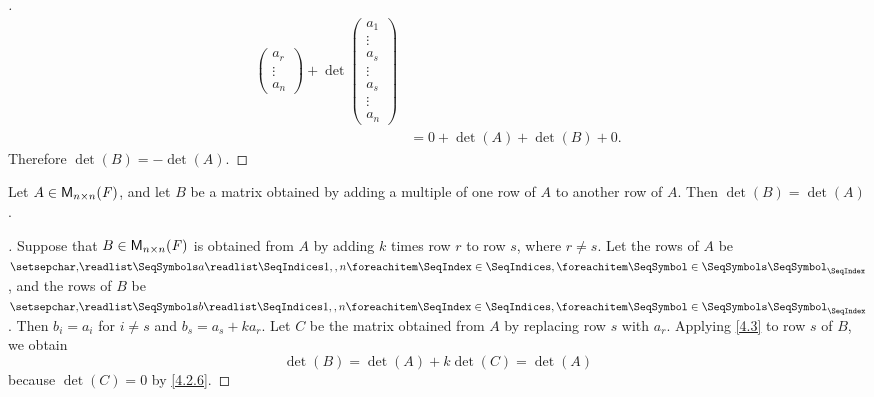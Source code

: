 \begin{proof}[]
\begin{align*}
\begin{pmatrix}
                                                        a_r    \\
                                                        \vdots \\
                                                        a_n
                                                      \end{pmatrix} + \det\begin{pmatrix}
                                                                            a_1    \\
                                                                            \vdots \\
                                                                            a_s    \\
                                                                            \vdots \\
                                                                            a_s    \\
                                                                            \vdots \\
                                                                            a_n
                                                                          \end{pmatrix} \\
      & = 0 + \det(A) + \det(B) + 0.
  \end{align*}
  Therefore \(\det(B) = -\det(A)\).
\end{proof}

\begin{thm}\label{4.6}
  Let \(A \in \mathsf{M}_{{n} \times n}({\mathit{F}})\), and let \(B\) be a matrix obtained by adding a multiple of one row of \(A\) to another row of \(A\).
  Then \(\det(B) = \det(A)\).
\end{thm}

\begin{proof}[]
  Suppose that \(B \in \mathsf{M}_{{n} \times n}({\mathit{F}})\) is obtained from \(A\) by adding \(k\) times row \(r\) to row \(s\), where \(r \neq s\).
  Let the rows of \(A\) be \(\seq{a}{1,,n}\), and the rows of \(B\) be \(\seq{b}{1,,n}\).
  Then \(b_i = a_i\) for \(i \neq s\) and \(b_s = a_s + k a_r\).
  Let \(C\) be the matrix obtained from \(A\) by replacing row \(s\) with \(a_r\).
  Applying \cref{4.3} to row \(s\) of \(B\), we obtain
  \[
    \det(B) = \det(A) + k \det(C) = \det(A)
  \]
  because \(\det(C) = 0\) by \cref{4.2.6}.
\end{proof}

